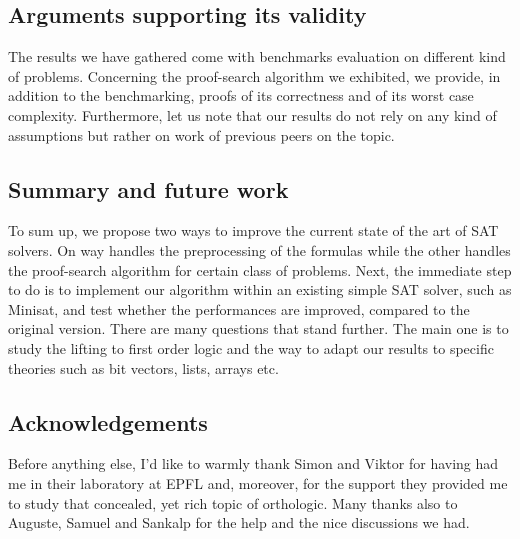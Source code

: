 \documentclass[a4paper, 11pt]{article}
\begin{document}


	\subsection*{Arguments supporting its validity}
	The results we have gathered come with benchmarks evaluation on different kind of problems.
	Concerning the proof-search algorithm we exhibited, we provide, in addition to the benchmarking, 
	proofs of its correctness and of its worst case complexity. Furthermore, let us note that our
	results do not rely on any kind of assumptions but rather on work of previous peers on the topic.



	\subsection*{Summary and future work}
	To sum up, we propose two ways to improve the current state of the art of SAT solvers. 
	On way handles the preprocessing of the formulas while the other handles the proof-search
	algorithm for certain class of problems. Next, the immediate step to do is
	to implement our algorithm within an existing simple SAT solver, such as Minisat, and test
	whether the performances are improved, compared to the original version. There are many questions
	that stand further. The main one is to study the lifting to first order logic and the way to 
	adapt our results to specific theories such as bit vectors, lists, arrays etc.


	\subsection*{Acknowledgements}
	Before anything else, I'd like to warmly thank Simon and Viktor for having had me in their 
	laboratory at EPFL and, moreover, for the support they provided me to study that concealed, yet
	rich topic of orthologic. Many thanks also to Auguste, Samuel and Sankalp for the help and 
	the nice discussions we had.
\end{document}
